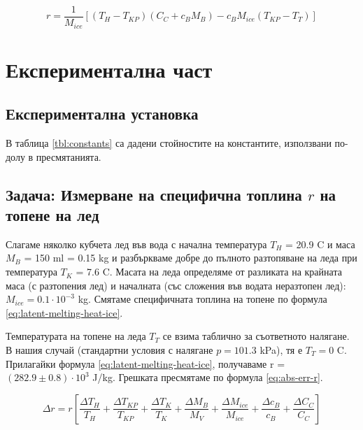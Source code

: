 \documentclass[12pt]{article}
\begin{document}
\begin{equation}\label{eq:latent-melting-heat-ice}
    r = \frac{1}{M_{ice}}\left[(T_H - T_{KP})(C_C + c_BM_B) - c_BM_{ice}(T_{KP} - T_T)\right]
\end{equation}

\section{Експериментална част}

\subsection{Експериментална установка}

В таблица \ref{tbl:constants} са дадени стойностите на константите, използвани по-долу в пресмятанията. 

\subsection{Задача: Измерване на специфична топлина $r$ на топене на лед}
Слагаме няколко кубчета лед във вода с начална температура $T_H$ = 20.9 \degree C и маса $M_B$ = 150 ml = 0.15 kg и разбъркваме добре до пълното разтопяване на леда при температура $T_K$ = 7.6 \degree C. Масата на леда определяме от разликата на крайната маса (с разтопения лед) и началната (със сложения във водата неразтопен лед): $M_{ice} = 0.1 \cdot 10^{-3}$ kg. Смятаме специфичната топлина на топене по формула \ref{eq:latent-melting-heat-ice}.

Температурата на топене на леда $T_T$ се взима таблично за съответното налягане. В нашия случай (стандартни условия с налягане $p = 101.3$ kPa), тя е $T_T = 0$ \degree C. Прилагайки формула \ref{eq:latent-melting-heat-ice}, получаваме r = $(282.9 \pm 0.8) \cdot 10^3$ J/kg. Грешката пресмятаме по формула \ref{eq:abs-err-r}.

\begin{equation}\label{eq:abs-err-r}
    \Delta r = r\left[\frac{\Delta T_H}{T_H} + \frac{\Delta T_{KP}}{T_{KP}} + \frac{\Delta T_K}{T_K} + \frac{\Delta M_B}{M_V} + \frac{\Delta M_{ice}}{M_{ice}} + \frac{\Delta c_{B}}{c_{B}} + \frac{\Delta C_C}{C_C}\right]
\end{equation}
\end{document}
